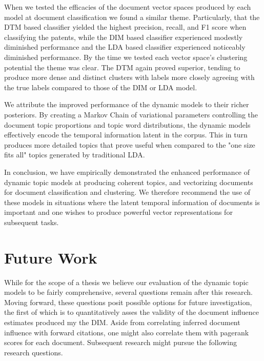 When we tested the efficacies of the document vector spaces produced by each model at document classification we found a similar theme. Particularly, that the DTM based classifier yielded the highest precision, recall, and F1 score when classifying the patents, while the DIM based classifier experienced modestly diminished performance and the LDA based classifier experienced noticeably diminished performance. By the time we tested each vector space's clustering potential the theme was clear. The DTM again proved superior, tending to produce more dense and distinct clusters with labels more closely agreeing with the true labels compared to those of the DIM or LDA model.

We attribute the improved performance of the dynamic models to their richer posteriors. By creating a Markov Chain of variational parameters controlling the document topic proportions and topic word distributions, the dynamic models effectively encode the temporal information latent in the corpus. This in turn produces more detailed topics that prove useful when compared to the "one size fits all" topics generated by traditional LDA.

In conclusion, we have empirically demonstrated the enhanced performance of dynamic topic models at producing coherent topics, and vectorizing documents for document classification and clustering. We therefore recommend the use of these models in situations where the latent temporal information of documents is important and one wishes to produce powerful vector representations for subsequent tasks.

\section{Future Work}
While for the scope of a thesis we believe our evaluation of the dynamic topic models to be fairly comprehensive, several questions remain after this research. Moving forward, these questions posit possible options for future investigation, the first of which is to quantitatively asses the validity of the document influence estimates produced my the DIM. Aside from correlating inferred document influence with forward citations, one might also correlate them with pagerank scores for each document. Subsequent research might pursue the following research questions.

